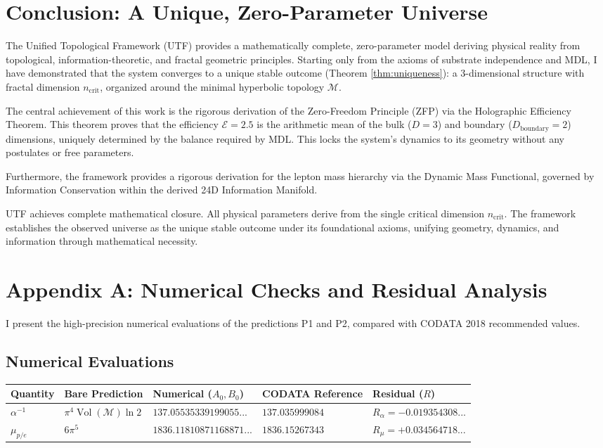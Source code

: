 \documentclass[11pt, a4paper]{article}
\theoremstyle{definition}
\theoremstyle{definition}
\newcommand{\M}{\mathcal{M}}
\newcommand{\Vol}{\operatorname{Vol}}
\newcommand{\Veight}{\Vol(\M)}
\newcommand{\ncrit}{n_{\mathrm{crit}}}
\newcommand{\Ecal}{\mathcal{E}} %
\newcommand{\Dboundary}{D_{\mathrm{boundary}}}
\newcommand{\Azero}{\pi^4 \Veight \ln 2}
\newcommand{\Bzero}{6\pi^5}
\newcommand{\AlphaPone}{137.05535339199055...}
\newcommand{\MuPtwo}{1836.11810871168871...}
\begin{document}

\section{Conclusion: A Unique, Zero-Parameter Universe}

The Unified Topological Framework (UTF) provides a mathematically complete, zero-parameter model deriving physical reality from topological, information-theoretic, and fractal geometric principles. Starting only from the axioms of substrate independence and MDL, I have demonstrated that the system converges to a unique stable outcome (Theorem \ref{thm:uniqueness}): a 3-dimensional structure with fractal dimension $\ncrit$, organized around the minimal hyperbolic topology $\M$.

The central achievement of this work is the rigorous derivation of the Zero-Freedom Principle (ZFP) via the Holographic Efficiency Theorem. This theorem proves that the efficiency $\Ecal=2.5$ is the arithmetic mean of the bulk ($D=3$) and boundary ($\Dboundary=2$) dimensions, uniquely determined by the balance required by MDL. This locks the system's dynamics to its geometry without any postulates or free parameters.

Furthermore, the framework provides a rigorous derivation for the lepton mass hierarchy via the Dynamic Mass Functional, governed by Information Conservation within the derived 24D Information Manifold.

UTF achieves complete mathematical closure. All physical parameters derive from the single critical dimension $\ncrit$. The framework establishes the observed universe as the unique stable outcome under its foundational axioms, unifying geometry, dynamics, and information through mathematical necessity.


\newpage

\appendix
\section{Appendix A: Numerical Checks and Residual Analysis}

I present the high-precision numerical evaluations of the predictions P1 and P2, compared with CODATA 2018 recommended values.

\subsection{Numerical Evaluations}
\begin{center}
\begin{tabular}{@{}lllll@{}}
\toprule
Quantity & Bare Prediction & Numerical ($A_0, B_0$) & CODATA Reference & Residual ($R$) \\
\midrule
$\alpha^{-1}$ & $\Azero$ & $\AlphaPone$ & $137.035999084$ & $R_\alpha = -0.019354308...$ \\
$\mu_{p/e}$ & $\Bzero$ & $\MuPtwo$ & $1836.15267343$ & $R_\mu = +0.034564718...$ \\
\bottomrule
\end{tabular}
\end{center}
\end{document}
